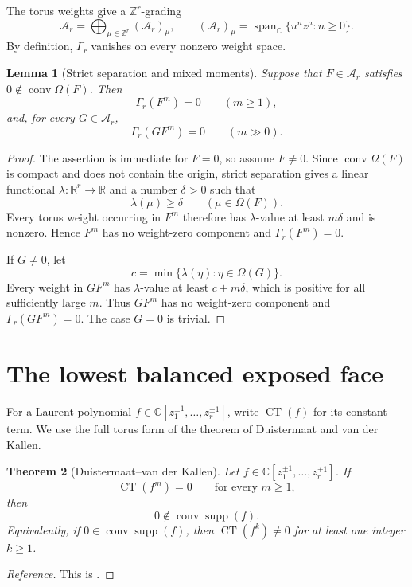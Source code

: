 \documentclass[11pt]{article}
\numberwithin{equation}{section}
\newtheorem{theorem}{Theorem}[section]
\newtheorem{lemma}[theorem]{Lemma}
\theoremstyle{definition}
\theoremstyle{remark}
\newcommand{\C}{\mathbb C}
\newcommand{\R}{\mathbb R}
\newcommand{\Z}{\mathbb Z}
\newcommand{\A}{\mathcal A}
\newcommand{\supp}{\operatorname{supp}}
\newcommand{\conv}{\operatorname{conv}}
\newcommand{\CT}{\operatorname{CT}}
\newcommand{\Span}{\operatorname{span}}
\begin{document}
The torus weights give a $\Z^r$-grading
\begin{equation}\label{eq:torus-grading}
  \A_r=\bigoplus_{\mu\in\Z^r}(\A_r)_\mu,
  \qquad
  (\A_r)_\mu=\Span_\C\{u^nz^\mu:n\ge0\}.
\end{equation}
By definition, $\Gamma_r$ vanishes on every nonzero weight space.

\begin{lemma}[Strict separation and mixed moments]\label{lem:separation}
Suppose that $F\in\A_r$ satisfies
$0\notin\conv\Omega(F)$.  Then
\[
  \Gamma_r(F^m)=0\qquad(m\ge1),
\]
and, for every $G\in\A_r$,
\[
  \Gamma_r(GF^m)=0\qquad(m\gg0).
\]
\end{lemma}

\begin{proof}
The assertion is immediate for $F=0$, so assume $F\ne0$.  Since
$\conv\Omega(F)$ is compact and does not contain the origin, strict
separation gives a linear functional $\lambda:\R^r\to\R$ and a number
$\delta>0$ such that
\[
  \lambda(\mu)\ge\delta
  \qquad(\mu\in\Omega(F)).
\]
Every torus weight occurring in $F^m$ therefore has $\lambda$-value at least
$m\delta$ and is nonzero.  Hence $F^m$ has no weight-zero component and
$\Gamma_r(F^m)=0$.

If $G\ne0$, let
\[
  c=\min\{\lambda(\eta):\eta\in\Omega(G)\}.
\]
Every weight in $GF^m$ has $\lambda$-value at least $c+m\delta$, which is
positive for all sufficiently large $m$.  Thus $GF^m$ has no weight-zero
component and $\Gamma_r(GF^m)=0$.  The case $G=0$ is trivial.
\end{proof}

\section{The lowest balanced exposed face}

For a Laurent polynomial
$f\in\C[z_1^{\pm1},\ldots,z_r^{\pm1}]$, write $\CT(f)$ for its constant
term.  We use the full torus form of the theorem of Duistermaat and van der
Kallen.

\begin{theorem}[Duistermaat--van der Kallen]\label{thm:dvdk}
Let $f\in\C[z_1^{\pm1},\ldots,z_r^{\pm1}]$.  If
\[
  \CT(f^m)=0\qquad\text{for every }m\ge1,
\]
then
\[
  0\notin\conv\supp(f).
\]
Equivalently, if $0\in\conv\supp(f)$, then $\CT(f^k)\ne0$ for at least one
integer $k\ge1$.
\end{theorem}

\begin{proof}[Reference]
This is \cite[Theorem~1]{DuistermaatVanderKallen1998}.
\end{proof}
\end{document}
